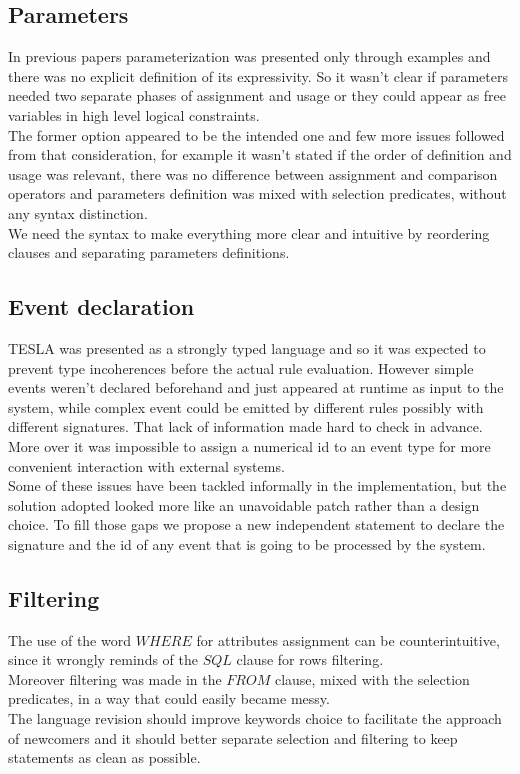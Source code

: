 \subsection{Parameters}
In previous papers parameterization was presented only through examples and there was no explicit definition of its expressivity. So it wasn't clear if parameters needed two separate phases of assignment and usage or they could appear as free variables in high level logical constraints.\\
The former option appeared to be the intended one and few more issues followed from that consideration, for example it wasn't stated if the order of definition and usage was relevant, there was no difference between assignment and comparison operators and parameters definition was mixed with selection predicates, without any syntax distinction.\\
We need the syntax to make everything more clear and intuitive by reordering clauses and separating parameters definitions.

\subsection{Event declaration}
TESLA was presented as a strongly typed language and so it was expected to prevent type incoherences before the actual rule evaluation. However simple events weren't declared beforehand and just appeared at runtime as input to the system, while complex event could be emitted by different rules possibly with different signatures. That lack of information made hard to check in advance.\\
More over it was impossible to assign a numerical id to an event type for more convenient interaction with external systems.\\
Some of these issues have been tackled informally in the implementation, but the solution adopted looked more like an unavoidable patch rather than a design choice. To fill those gaps we propose a new independent statement to declare the signature and the id of any event that is going to be processed by the system.

\subsection{Filtering}
The use of the word $WHERE$ for attributes assignment can be counterintuitive, since it wrongly reminds of the $SQL$  clause for rows filtering.\\
Moreover filtering was made in the $FROM$ clause, mixed with the selection predicates, in a way that could easily became messy.\\
The language revision should improve keywords choice to facilitate the approach of newcomers and it should better separate selection and filtering to keep statements as clean as possible.

